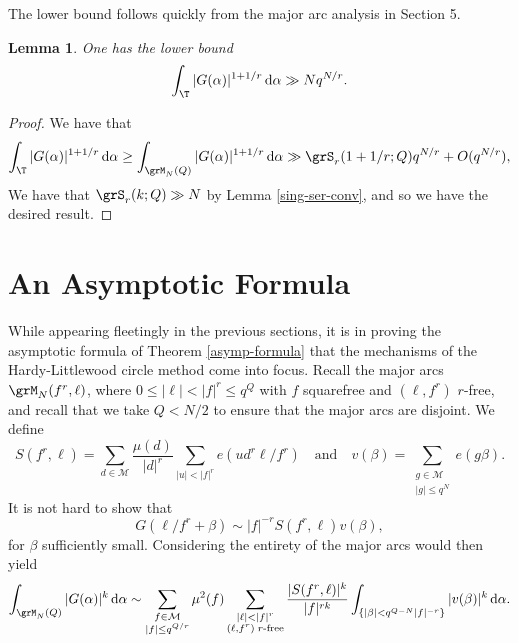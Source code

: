 \documentclass[reqno,11pt]{amsart}
\newtheorem{lemma}[theorem]{Lemma}
\theoremstyle{definition}
\theoremstyle{remark}
\numberwithin{equation}{section}
\def\calM{{\mathcal M}}
\renewcommand{\d}{\,{\rm d}} %
\newcommand{\<}{\begin{equation}}
\renewcommand{\>}{\end{equation}}
\begin{document}
The lower bound follows quickly from the major arc analysis in Section 5.
\begin{lemma}
    One has the lower bound
    \[\int_\T |G(\alpha)|^{1+1/r} \d\alpha \gg Nq^{N/r}.\]
\end{lemma}
\begin{proof}
    We have that
    \[\int_\T |G(\alpha)|^{1+1/r}\d\alpha \geq \int_{\grM_N(Q)} |G(\alpha)|^{1+1/r} \d\alpha \gg \grS_r(1+1/r;Q)q^{N/r} + O(q^{N/r}),\]
    We have that $\grS_r(k;Q) \gg N$ by Lemma \ref{sing-ser-conv}, and so we have the desired result.
\end{proof}


























\section{An Asymptotic Formula}

While appearing fleetingly in the previous sections, it is in proving the asymptotic formula of Theorem \ref{asymp-formula} that the mechanisms of the Hardy-Littlewood circle method come into focus. Recall the major arcs $\grM_N(f^r, \ell)$, where $0\leq |\ell|<|f|^r \leq q^Q$ with $f$ squarefree and $(\ell,f^r)$ $r$-free, and recall that we take $Q<N/2$ to ensure that the major arcs are disjoint. We define
\[S(f^r,\ell) = \sum_{d \in \calM} \dfrac{\mu(d)}{|d|^r} \sum_{|u| < |f|^r}e(ud^r\ell/f^r) \quad \text{and}\quad v(\beta) = \sum_{\substack{g \in \calM \\ |g| \leq q^N}} e(g\beta).\]
It is not hard to show that
\[G(\ell/f^r+\beta) \sim |f|^{-r} S(f^r,\ell)v(\beta),\]
for $\beta$ sufficiently small. Considering the entirety of the major arcs would then yield
\[\int_{\grM_N(Q)} |G(\alpha)|^k \d\alpha \sim \sum_{\substack{f \in \calM \\ |f| \leq q^{Q/r}}}\mu^2(f)\sum_{\substack{|\ell|<|f|^r \\ (\ell,f^r) \; r\text{-free}}} \dfrac{|S(f^r,\ell)|^k}{|f|^{rk}} \int_{\{|\beta| < q^{Q-N}|f|^{-r}\}} |v(\beta)|^k \d\alpha.\]
\end{document}
